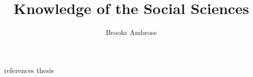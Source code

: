 \documentclass [PhD] {uclathes}
\title          {Knowledge of the Social Sciences}
\author         {Brooks Ambrose}
\begin{document}
%
%

 {references}    %
 {thesis}
\end{document}
